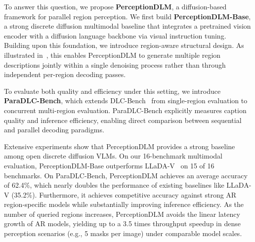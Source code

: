 \documentclass{llmxive}
\begin{document}
To answer this question, we propose \textbf{PerceptionDLM}, a diffusion-based framework for parallel region perception. 
%
We first build \textbf{PerceptionDLM-Base}, a strong discrete diffusion multimodal baseline that integrates a pretrained vision encoder with a diffusion language backbone via visual instruction tuning. 
%
Building upon this foundation, we introduce region-aware structural design. As illustrated in~, this enables PerceptionDLM to generate multiple region descriptions jointly within a single denoising process rather than through independent per-region decoding passes.

To evaluate both quality and efficiency under this setting, we introduce \textbf{ParaDLC-Bench}, which extends DLC-Bench~\citep{lian2025describe} from single-region evaluation to concurrent multi-region evaluation. 
%
ParaDLC-Bench explicitly measures caption quality and inference efficiency, enabling direct comparison between sequential and parallel decoding paradigms. 
%

Extensive experiments show that PerceptionDLM provides a strong baseline among open discrete diffusion VLMs. On our 16-benchmark multimodal evaluation, PerceptionDLM-Base outperforms LLaDA-V~\citep{you2025llada} on 15 of 16 benchmarks. On ParaDLC-Bench, PerceptionDLM achieves an average accuracy of 62.4\%, which nearly doubles the performance of existing baselines like LLaDA-V (35.2\%).
%
Furthermore, it achieves competitive accuracy against strong AR region-specific models while substantially improving inference efficiency. As the number of queried regions increases, PerceptionDLM avoids the linear latency growth of AR models, yielding up to a 3.5 times throughput speedup in dense perception scenarios (e.g., 5 masks per image) under comparable model scales.
\end{document}

